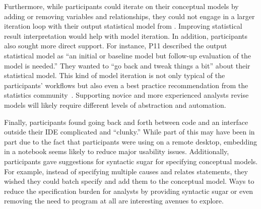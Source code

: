 Furthermore, while participants could iterate on their conceptual models by
adding or removing variables and relationships, they could not engage in a
larger iteration loop with their output statistical model from \rTisane.
Improving statistical result interpretation would help with model iteration. In
addition, participants also sought more direct support. For instance, P11
described the \rTisane output statistical model as ``an initial or baseline model
but follow-up evaluation of the model is needed.'' They wanted to ``go back and
tweak things a bit'' about their statistical model. This kind of model iteration
is not only typical of the participants' workflows but also even a best practice
recommendation from the statistics community~\cite{gelman2020modelExpansion}.
Supporting novice and more experienced analysts revise models will likely
require different levels of abstraction and automation. 

Finally, participants found going back and forth between code and an interface
outside their IDE complicated and ``clunky.'' While part of this may have been
in part due to the fact that participants were using \rTisane on a remote
desktop, embedding \rTisane in a notebook seems likely to reduce major usability
issues. Additionally, participants gave suggestions for syntactic sugar for
specifying conceptual models. For example, instead of specifying multiple causes
and relates statements, they wished they could batch specify and add them to the
conceptual model. Ways to reduce the specification burden for analysts by
providing syntactic sugar or even removing the need to program at all are
interesting avenues to explore. 
